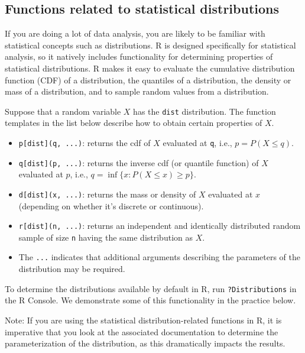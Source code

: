 \documentclass[
]{book}
\providecommand{\tightlist}{%
  \setlength{\itemsep}{0pt}\setlength{\parskip}{0pt}}
\theoremstyle{definition}
\theoremstyle{definition}
\theoremstyle{definition}
\theoremstyle{definition}
\theoremstyle{remark}
\begin{document}
\hypertarget{functions-related-to-statistical-distributions}{%
\subsection{Functions related to statistical distributions}\label{functions-related-to-statistical-distributions}}

If you are doing a lot of data analysis, you are likely to be familiar with statistical concepts such as distributions. R is designed specifically for statistical analysis, so it natively includes functionality for determining properties of statistical distributions. R makes it easy to evaluate the cumulative distribution function (CDF) of a distribution, the quantiles of a distribution, the density or mass of a distribution, and to sample random values from a distribution.

Suppose that a random variable \(X\) has the \texttt{dist} distribution. The function templates in the list below describe how to obtain certain properties of \(X\).

\begin{itemize}
\tightlist
\item
  \texttt{p{[}dist{]}(q,\ ...)}: returns the cdf of \(X\) evaluated at \texttt{q}, i.e., \(p=P(X\leq q)\).
\item
  \texttt{q{[}dist{]}(p,\ ...)}: returns the inverse cdf (or quantile function) of \(X\) evaluated at \(p\), i.e., \(q = \inf\{x: P(X\leq x) \geq p\}\).
\item
  \texttt{d{[}dist{]}(x,\ ...)}: returns the mass or density of \(X\) evaluated at \(x\) (depending on whether it's discrete or continuous).
\item
  \texttt{r{[}dist{]}(n,\ ...)}: returns an independent and identically distributed random sample of size \texttt{n} having the same distribution as \(X\).
\item
  The \texttt{...} indicates that additional arguments describing the parameters of the distribution may be required.
\end{itemize}

To determine the distributions available by default in R, run \texttt{?Distributions} in the R Console. We demonstrate some of this functionality in the practice below.

Note: If you are using the statistical distribution-related functions in R, it is imperative that you look at the associated documentation to determine the parameterization of the distribution, as this dramatically impacts the results.
\end{document}
